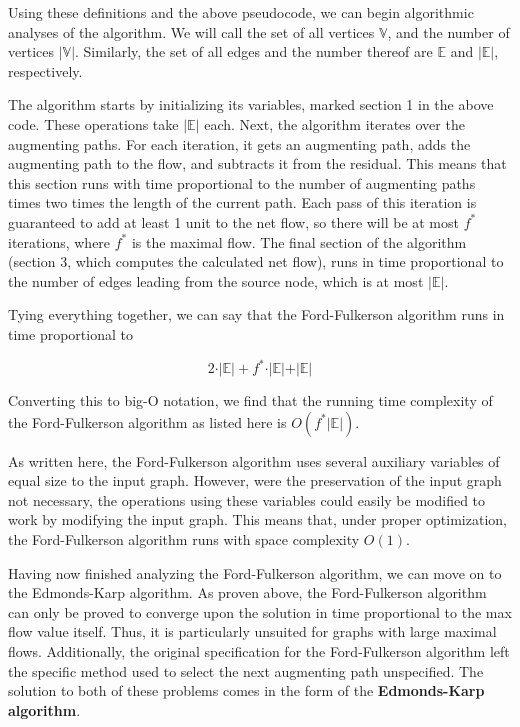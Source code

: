 \documentclass[12pt]{amsart}
\begin{document}
    Using these definitions and the above pseudocode, we can
    begin algorithmic analyses of the algorithm. We will call
    the set of all vertices $\mathbb{V}$, and the number of
    vertices $\vert \mathbb{V} \vert$. Similarly, the set of all
    edges and the number thereof are $\mathbb{E}$ and
    $\vert \mathbb{E} \vert$, respectively.
    
    The algorithm starts by initializing its variables, marked
    section 1 in the above code. These operations take
    $\vert \mathbb{E} \vert$ each. Next, the algorithm iterates
    over the augmenting paths. For each iteration, it gets an
    augmenting path, adds the augmenting path to the flow, and
    subtracts it from the residual. This means that this section
    runs with time proportional to the number of augmenting
    paths times two times the length of the current path. Each
    pass of this iteration is guaranteed to add at least 1 unit
    to the net flow, so there will be at most $f^*$ iterations,
    where $f^*$ is the maximal flow. The final section of the
    algorithm (section 3, which computes the calculated net
    flow), runs in time proportional to the number of edges
    leading from the source node, which is at most
    $\vert \mathbb{E} \vert$.

    Tying everything together, we can say that the
    Ford-Fulkerson algorithm runs in time proportional to

\[
    2 \cdot \vert \mathbb{E} \vert + f^* \cdot \vert \mathbb{E} \vert + \vert \mathbb{E} \vert
\]

    Converting this to big-O notation, we find that the running
    time complexity of the Ford-Fulkerson algorithm as listed
    here is $O(f^* \vert \mathbb{E} \vert )$.

    As written here, the Ford-Fulkerson algorithm uses several
    auxiliary variables of equal size to the input graph.
    However, were the preservation of the input graph not
    necessary, the operations using these variables could easily
    be modified to work by modifying the input graph. This
    means that, under proper optimization, the Ford-Fulkerson
    algorithm runs with space complexity $O(1)$.

    Having now finished analyzing the Ford-Fulkerson algorithm,
    we can move on to the Edmonds-Karp algorithm. As proven
    above, the Ford-Fulkerson algorithm can only be proved to
    converge upon the solution in time proportional to the max
    flow value itself. Thus, it is particularly unsuited for
    graphs with large maximal flows. Additionally, the original
    specification for the Ford-Fulkerson algorithm left the
    specific method used to select the next augmenting path
    unspecified. The solution to both of these problems comes
    in the form of the \textbf{Edmonds-Karp algorithm}.
\end{document}
